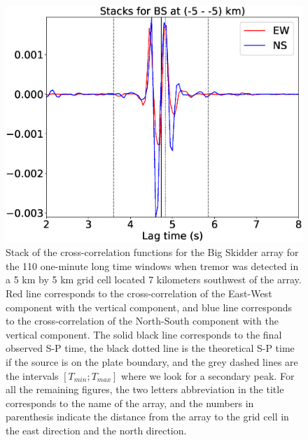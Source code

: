 \documentclass[letterpaper, 12pt]{article}
\begin{document}
\begin{figure}
\includegraphics[width=\linewidth]{figures/intervals/BS_-05_-05_stacks.eps}
\caption{Stack of the cross-correlation functions for the Big Skidder array for the 110 one-minute long time windows when tremor was detected in a 5 km by 5 km grid cell located 7 kilometers southwest of the array. Red line corresponds to the cross-correlation of the East-West component with the vertical component, and blue line corresponds to the cross-correlation of the North-South component with the vertical component. The solid black line corresponds to the final observed S-P time, the black dotted line is the theoretical S-P time if the source is on the plate boundary, and the grey dashed lines are the intervals $\left[T_{min} ; T_{max}\right]$ where we look for a secondary peak. For all the remaining figures, the two letters abbreviation in the title corresponds to the name of the array, and the numbers in parenthesis indicate the distance from the array to the grid cell in the east direction and the north direction.}
\end{figure}
\end{document}
